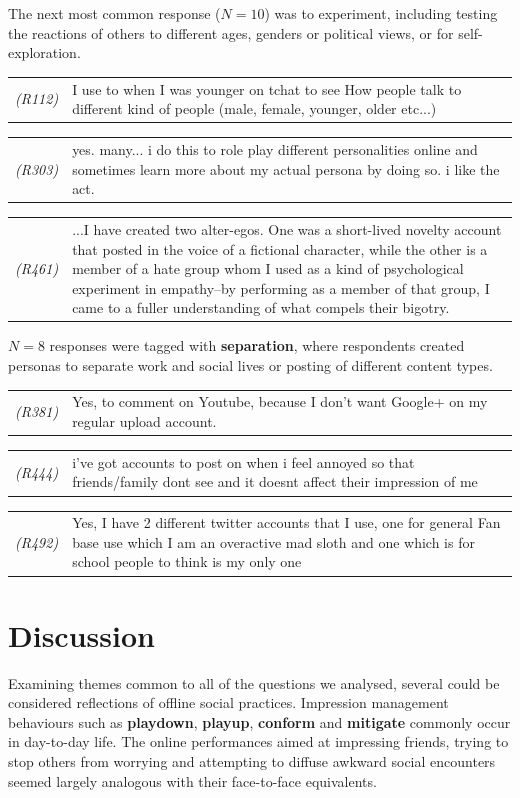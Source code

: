 \documentclass{sig-alternate}
\newcommand{\todo}[1]{\textbf{\color{red}TODO: #1}}
\newcommand{\stag}[1]{\textbf{#1}}
\newcommand{\example}[2]{%

\vspace{0.10cm}

\hspace{-3.9ex} \begin{tabular}{ p{0.6cm} p{7.15cm} }
    {\it \small (R#1)} & #2 \\
\end{tabular}%
\vspace{0.10cm}

}
\begin{document}
The next most common response ($N=10$) was to experiment, including testing the reactions of others to different ages, genders or political views, or for self-exploration.

\example{112}{I use to when I was younger on tchat to see How people talk to different kind of people (male, female, younger, older etc...)}

\example{303}{yes. many... i do this to role play different personalities online and sometimes learn more about my actual persona by doing so. i like the act.}

\example{461}{...I have created two alter-egos. One was a short-lived novelty account that posted in the voice of a fictional character, while the other is a member of a hate group whom I used as a kind of psychological experiment in empathy--by performing as a member of that group, I came to a fuller understanding of what compels their bigotry.}

$N=8$ responses were tagged with \stag{separation}, where respondents created personas to separate work and social lives or posting of different content types.

\example{381}{Yes, to comment on Youtube, because I don't want Google+ on my regular upload account.}

\example{444}{i've got accounts to post on when i feel annoyed so that friends/family dont see and it doesnt affect their impression of me}

\example{492}{Yes, I have 2 different twitter accounts that I use, one for general Fan base use which I am an overactive mad sloth and one which is for school people to think is my only one}


\section{Discussion}

Examining themes common to all of the questions we analysed, several could be considered reflections of offline social practices. Impression management behaviours such as \stag{playdown}, \stag{playup}, \stag{conform} and \stag{mitigate} 
commonly occur in day-to-day life. The online performances aimed at impressing friends, trying to stop others from worrying and attempting to diffuse awkward social encounters seemed largely analogous with their face-to-face equivalents.
\end{document}
